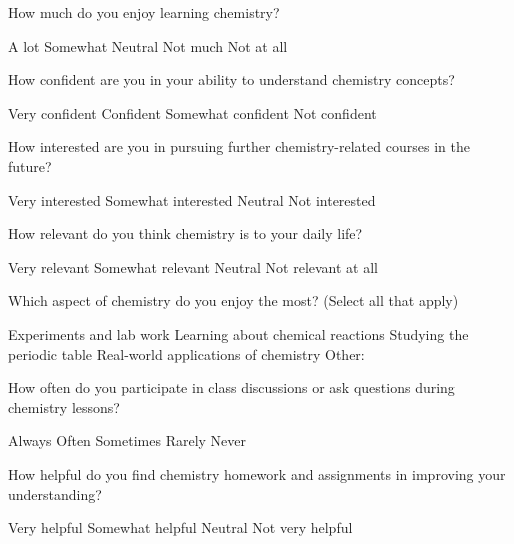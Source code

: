 \documentclass{exam}
\begin{document}
\begin{questions}
    
\question How much do you enjoy learning chemistry?  
\begin{checkboxes}
    \choice A lot  
    \choice Somewhat  
    \choice Neutral  
    \choice Not much  
    \choice Not at all
\end{checkboxes}

\question How confident are you in your ability to understand chemistry concepts?  
\begin{checkboxes}
    \choice Very confident  
    \choice Confident  
    \choice Somewhat confident  
    \choice Not confident
\end{checkboxes}


\question How interested are you in pursuing further chemistry-related courses in the future?  
\begin{checkboxes}
    
    \choice Very interested  
    \choice Somewhat interested  
    \choice Neutral  
    \choice Not interested
\end{checkboxes}

\question How relevant do you think chemistry is to your daily life?  
\begin{checkboxes}
    \choice Very relevant  
    \choice Somewhat relevant  
    \choice Neutral  
    \choice Not relevant at all
\end{checkboxes}
   

\question Which aspect of chemistry do you enjoy the most? (Select all that apply)  
   \begin{checkboxes}
   \choice Experiments and lab work  
   \choice Learning about chemical reactions  
   \choice Studying the periodic table  
   \choice Real-world applications of chemistry  
   \choice Other:
\end{checkboxes}
   
\question How often do you participate in class discussions or ask questions during chemistry lessons?  
   \begin{checkboxes}
   \choice Always  
   \choice Often  
   \choice Sometimes  
   \choice Rarely  
   \choice Never
\end{checkboxes}
   
\question How helpful do you find chemistry homework and assignments in improving your understanding?  
\begin{checkboxes}
    \choice Very helpful  
    \choice Somewhat helpful  
    \choice Neutral  
    \choice Not very helpful
\end{checkboxes}
   

\end{questions}
\end{document}
